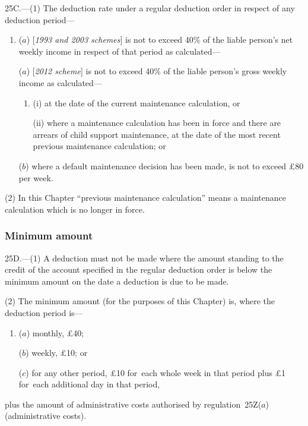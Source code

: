 \documentclass[12pt,a4paper]{article}
\begin{document}
25C.---(1)  The deduction rate under a regular deduction order in respect of any deduction period—
\begin{enumerate}\item[]
($a$) [\emph{1993 and 2003 schemes}] is not to exceed 40\% of the liable person’s net weekly income in respect of that period as calculated—

($a$) [\emph{2012 scheme}] is not to exceed 40\% of the liable person’s 
gross  %
weekly income 
as calculated—
\begin{enumerate}\item[]
(i) at the date of the current maintenance calculation, or

(ii) where a maintenance calculation has been in force and there are arrears of child support maintenance, at the date of the most recent previous maintenance calculation; or
\end{enumerate}

($b$) where a default maintenance decision has been made, is not to exceed £80 per week.
\end{enumerate}

(2) In this Chapter “previous maintenance calculation” means a maintenance calculation which is no longer in force.


\subsubsection[25D. Minimum amount]{Minimum amount}

25D.---(1)  A deduction must not be made where the amount standing to the credit of the account specified in the regular deduction order is below the minimum amount on the date a deduction is due to be made.

(2) The minimum amount (for the purposes of this Chapter) is, where the deduction period is—
\begin{enumerate}\item[]
($a$) monthly, £40;

($b$) weekly, £10; or

($c$) for any other period, £10 for~each whole week in that period plus £1 for~each additional day in that period,
\end{enumerate}
plus the amount of administrative costs authorised by regulation~25Z($a$)  (administrative costs).
\end{document}
